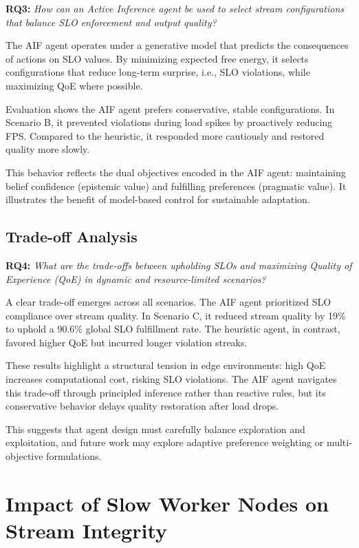 \textbf{RQ3:} \textit{How can an Active Inference agent be used to select stream configurations that balance SLO enforcement and output quality?}

The AIF agent operates under a generative model that predicts the consequences of actions on SLO values. By minimizing expected free energy, it selects configurations that reduce long-term surprise, i.e., SLO violations, while maximizing QoE where possible.

Evaluation shows the AIF agent prefers conservative, stable configurations. In Scenario B, it prevented violations during load spikes by proactively reducing FPS. Compared to the heuristic, it responded more cautiously and restored quality more slowly.

This behavior reflects the dual objectives encoded in the AIF agent: maintaining belief confidence (epistemic value) and fulfilling preferences (pragmatic value). It illustrates the benefit of model-based control for sustainable adaptation.

\subsection{Trade-off Analysis}

\textbf{RQ4:} \textit{What are the trade-offs between upholding SLOs and maximizing Quality of Experience (QoE) in dynamic and resource-limited scenarios?}

A clear trade-off emerges across all scenarios. The AIF agent prioritized SLO compliance over stream quality. In Scenario C, it reduced stream quality by 19\% to uphold a 90.6\% global SLO fulfillment rate. The heuristic agent, in contrast, favored higher QoE but incurred longer violation streaks.

These results highlight a structural tension in edge environments: high QoE increases computational cost, risking SLO violations. The AIF agent navigates this trade-off through principled inference rather than reactive rules, but its conservative behavior delays quality restoration after load drops.

This suggests that agent design must carefully balance exploration and exploitation, and future work may explore adaptive preference weighting or multi-objective formulations.

\section{Impact of Slow Worker Nodes on Stream Integrity}

